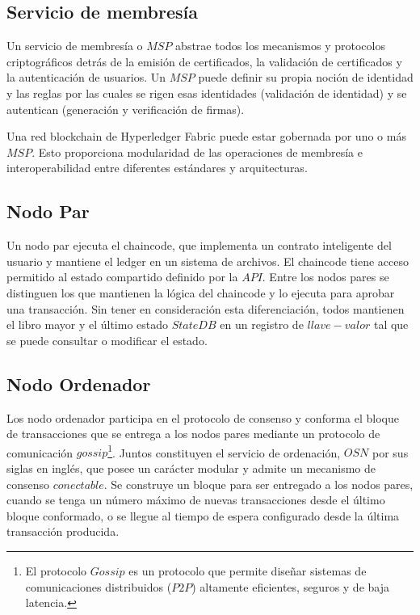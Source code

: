 \subsection{Servicio de membres\'ia}
Un servicio de membres\'ia o $MSP$ abstrae todos los mecanismos y protocolos criptogr\'aficos detr\'as de la emisi\'on de certificados, la validaci\'on de certificados y la autenticaci\'on de usuarios. Un $MSP$ puede definir su propia noci\'on de identidad y las reglas por las cuales se rigen esas identidades (validaci\'on de identidad) y se autentican (generaci\'on y verificaci\'on de firmas).

Una red blockchain de Hyperledger Fabric puede estar gobernada por uno o m\'as $MSP$. Esto proporciona modularidad de las operaciones de membres\'ia e interoperabilidad entre diferentes est\'andares y arquitecturas.


\subsection{Nodo Par}
Un nodo par ejecuta el chaincode, que implementa un contrato inteligente del usuario y mantiene el ledger en un sistema de archivos. El chaincode tiene acceso permitido al estado compartido definido por la $API$. Entre los nodos pares se distinguen los que mantienen la l\'ogica del chaincode y lo ejecuta para aprobar una transacci\'on. Sin tener en consideraci\'on esta diferenciaci\'on, todos mantienen el libro mayor y el \'ultimo estado $StateDB$ en un registro de $llave-valor$ tal que se puede consultar o modificar el estado.

\subsection{Nodo Ordenador}
Los nodo ordenador participa en el protocolo de consenso y conforma el bloque de transacciones que se entrega a los nodos pares mediante un protocolo de comunicaci\'on $gossip$\footnote{El protocolo $Gossip$ es un protocolo que permite dise\~nar sistemas de comunicaciones distribuidos ($P2P$) altamente eficientes, seguros y de baja latencia.}. Juntos constituyen el servicio de ordenaci\'on, $OSN$ por sus siglas en ingl\'es, que posee un car\'acter modular y admite un mecanismo de consenso $conectable$. Se construye un bloque para ser entregado a los nodos pares, cuando se tenga un n\'umero m\'aximo de nuevas transacciones desde el \'ultimo bloque conformado, o se llegue al tiempo de espera configurado desde la \'ultima transacci\'on producida.

